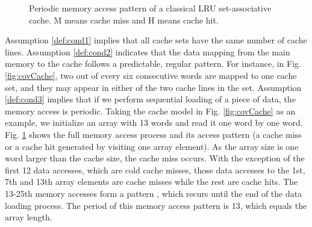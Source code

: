 \documentclass[10pt,journal,compsoc]{IEEEtran}
\theoremstyle{definition}
\begin{document}
\begin{figure}
\centering
{}
\vspace{-1em}
\caption{Periodic memory access pattern of a classical LRU set-associative cache. M means cache miss and H means cache hit.}
\label{fig:PeriodicOutput}
\end{figure}

Assumption \ref{def:cond1} implies that all cache sets have the same number of cache lines. Assumption \ref{def:cond2} indicates that the data mapping from the main memory to the cache follows a predictable, regular pattern. For instance, in Fig. \ref{fig:covCache}, two out of every six consecutive words are mapped to one cache set, and they may appear in either of the two cache lines in the set. Assumption \ref{def:cond3} implies that if we perform sequential loading of a piece of data, the memory access is periodic. Taking the cache model in Fig. \ref{fig:covCache} as an example, we initialize an array with 13 words and read it one word by one word. Fig. \ref{fig:PeriodicOutput} shows the full memory access process and its access pattern (a cache miss or a cache hit generated by visiting one array element). As the array size is one word larger than the cache size, the cache miss occurs. With the exception of the first 12 data accesses, which are cold cache misses, those data accesses to the 1st, 7th and 13th array elements are cache misses while the rest are cache hits. The 13-25th memory accesses form a pattern , which recurs until the end of the data loading process. The period of this memory access pattern is 13, which equals the array length.
\end{document}
